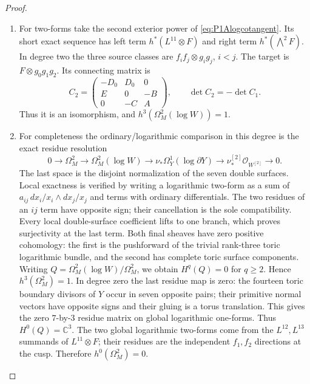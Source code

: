 \begin{proof}
\begin{enumerate}[label={$\langle1\rangle$\arabic*.}]
\item For two-forms take the second exterior power of
\eqref{eq:P1Alogcotangent}. Its short exact sequence has left
term $h^*(L^{11}\otimes F)$ and right term
$h^*(\bigwedge^2F)$. In degree two the three source classes
are $f_if_j\otimes g_ig_j$, $i<j$. The target is
$F\otimes g_0g_1g_2$. Its connecting matrix is
\[
C_2=\begin{pmatrix}-D_0&D_0&0\\E&0&-B\\0&-C&A\end{pmatrix},
\qquad \det C_2=-\det C_1.
\]
Thus it is an isomorphism, and
$h^3(\Omega_M^2(\log W))=1$.

\item For completeness the ordinary/logarithmic comparison in this
degree is the exact residue resolution
\[
0\to\Omega_M^2\to\Omega_M^2(\log W)
 \to\nu_*\Omega_Y^1(\log\partial Y)
 \to\nu^{[2]}_*\mathcal O_{W^{[2]}}\to0.
\]
The last space is the disjoint normalization of the seven
double surfaces. Local exactness is verified by writing a
logarithmic two-form as a sum of
$a_{ij}\,dx_i/x_i\wedge dx_j/x_j$ and terms with ordinary
differentials. The two residues of an $ij$ term have opposite
sign; their cancellation is the sole compatibility. Every local
double-surface coefficient lifts to one branch, which proves
surjectivity at the last term.
Both final sheaves have zero positive cohomology: the first
is the pushforward of the trivial rank-three toric logarithmic
bundle, and the second has complete toric surface components.
Writing $Q=\Omega_M^2(\log W)/\Omega_M^2$, we obtain
$H^q(Q)=0$ for $q\ge2$. Hence
$h^3(\Omega_M^2)=1$.
In degree zero the last residue map is zero: the fourteen toric
boundary divisors of $Y$ occur in seven opposite pairs; their
primitive normal vectors have opposite signs and their gluing
is a torus translation. This gives the zero $7$-by-$3$ residue
matrix on global logarithmic one-forms. Thus $H^0(Q)=\mathbb C^3$.
The two global logarithmic two-forms come from the
$L^{12},L^{13}$ summands of $L^{11}\otimes F$; their residues
are the independent $f_1,f_2$ directions at the cusp.
Therefore $h^0(\Omega_M^2)=0$.


\end{enumerate}
\end{proof}
